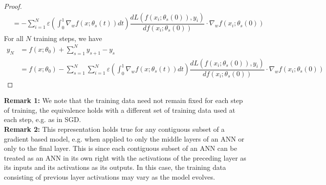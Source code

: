 \begin{proof}
\begin{align}
 &=  - \sum_{i = 1}^{N} \varepsilon\left(\int_0^1\nabla_w f(x; \theta_s(t))dt\right) \dfrac{d L(f(x_i; \theta_s(0)),  y_i)}{d f(x_i; \theta_s(0))}   \cdot \nabla_w f(x_i; \theta_s(0))
\end{align}
For all $N$ training steps, we have
\begin{align}
y_N &= f(x; \theta_0) + \sum_{s=1}^N y_{s+1} - y_s \\
&= f(x; \theta_0) - \sum_{s = 1}^N \sum_{i = 1}^{N} \varepsilon\left(\int_0^1\nabla_w f(x; \theta_s(t))dt\right) \dfrac{d L(f(x_i; \theta_s(0)),  y_i)}{d f(x_i; \theta_s(0))}   \cdot \nabla_w f(x_i; \theta_s(0))
\end{align}
\end{proof}
    
\textbf{Remark 1:} We note that the training data need not remain fixed for each step of training, the equivalence holds with a different set of training data used at each step, e.g. as in SGD.  \\
\textbf{Remark 2:} This representation holds true for any contiguous subset of a gradient based model, e.g. when applied to only the middle layers of an ANN or only to the final layer. This is since each contiguous subset of an ANN can be treated as an ANN in its own right with the activations of the preceding layer as its inputs and its activations as its outputs. In this case, the training data consisting of previous layer activations may vary as the model evolves. %

